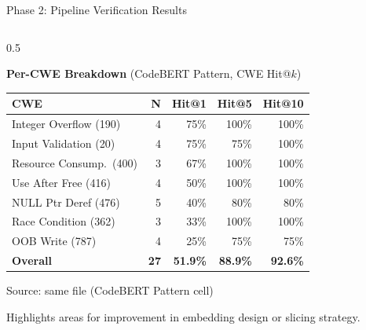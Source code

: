\documentclass[aspectratio=169,10pt]{beamer}
\newcommand{\chit}[1]{\cellcolor{hit!30} #1}
\newcommand{\cmiss}[1]{\cellcolor{miss!25} #1}
\newcommand{\cwarn}[1]{\cellcolor{warn!30} #1}
\begin{document}
\begin{frame}{Phase 2: Pipeline Verification Results}
\begin{columns}[T]
\begin{column}{0.5\textwidth}
  \begin{center}
  {\small\textbf{Per-CWE Breakdown} {\scriptsize(CodeBERT Pattern, CWE Hit@$k$)}}\\[6pt]
  {\scriptsize
  \renewcommand{\arraystretch}{1.35}
  \setlength{\tabcolsep}{3.5pt}
  \begin{tabular}{l r rrr}
    \toprule
    \textbf{CWE} & \textbf{N} & \textbf{Hit@1} & \textbf{Hit@5} & \textbf{Hit@10} \\
    \midrule
    Integer Overflow (190) & 4 & \chit{75\%} & 100\% & 100\% \\
    Input Validation (20) & 4 & \chit{75\%} & 75\% & 100\% \\
    Resource Consump.\ (400) & 3 & \chit{67\%} & 100\% & 100\% \\
    Use After Free (416) & 4 & 50\% & 100\% & 100\% \\
    NULL Ptr Deref (476) & 5 & \cwarn{40\%} & 80\% & 80\% \\
    Race Condition (362) & 3 & \cwarn{33\%} & 100\% & 100\% \\
    OOB Write (787) & 4 & \cmiss{25\%} & 75\% & 75\% \\
    \midrule
    \textbf{Overall} & \textbf{27} & \textbf{51.9\%} & \textbf{88.9\%} & \textbf{92.6\%} \\
    \bottomrule
  \end{tabular}}

  \vspace{0.2em}
  {\tiny\textcolor{notecol}{Source: same file (CodeBERT Pattern cell)}}

  \vspace{0.2em}
  {\scriptsize\textcolor{notecol}{Highlights areas for improvement in embedding design or slicing strategy.}}
  \end{center}
    \end{column}
  \end{columns}
\end{frame}
\end{document}
